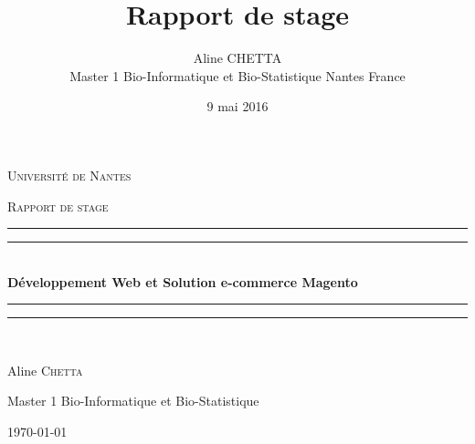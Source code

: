 \documentclass[12pt, a4paper, twoside]{report}
\author{Aline CHETTA \\
	Master 1 Bio-Informatique et Bio-Statistique
	Nantes
	France}
\date{9 mai 2016}
\title{Rapport de stage}
\begin{document}
	\begin{titlepage}
		\center
		
		\textsc{\huge Université de Nantes}\\[1.5cm]
		{\scshape\LARGE Rapport de stage\par}
		\rule[0.5ex]{\linewidth}{2pt}\vspace*{-\baselineskip}\vspace*{3.2pt}
		\rule[0.5ex]{\linewidth}{1pt}\\[\baselineskip]
		{ \huge \bfseries Développement Web et Solution e-commerce Magento}\\[0.4cm]
		\rule[0.5ex]{\linewidth}{2pt}\vspace*{-\baselineskip}\vspace*{3.2pt}
		\rule[0.5ex]{\linewidth}{1pt}\\[\baselineskip]
		
		
		{\Large Aline \scshape \textsc{Chetta}\par}
		{\large Master 1 Bio-Informatique et Bio-Statistique\par}
		{\large \today\par}
		
		\vspace{3.5cm}
		

\end{titlepage}
\end{document}
